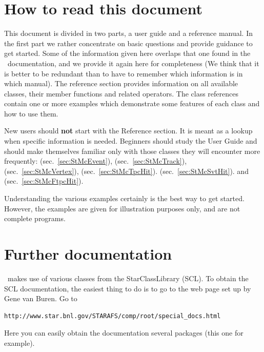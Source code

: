 \clearpage


\section{How to read this document}

This document is divided in two parts, a user guide and a
reference manual. In the first part we rather concentrate on basic
questions and provide guidance to get started.  Some of the information
given here overlaps that one found in the \StEvent\ documentation,
and we provide it again here for completeness (We think that it is better
to be redundant than to have to remember which information is in which
manual).  The reference section
provides information on all available classes, their member functions
and related operators. The class references contain one or more
examples which demonstrate some features of each class and how to use
them.

New users should \textbf{not} start with the Reference section. It is
meant as a lookup when specific information is needed. Beginners
should study the User Guide and should make themselves familiar only
with those classes they will encounter more frequently:
  (sec.~\ref{sec:StMcEvent}),
  (sec.~\ref{sec:StMcTrack}),
 (sec.~\ref{sec:StMcVertex}),
 (sec.~\ref{sec:StMcTpcHit}).
 (sec.~\ref{sec:StMcSvtHit}).
and  (sec.~\ref{sec:StMcFtpcHit}).



Understanding the various
examples certainly is the best way to get started. However, the examples
are given for illustration purposes only, and are not complete programs.


\section{Further documentation}
\label{sec:furtherdoc}

\StMcEvent\ makes use of various classes from the StarClassLibrary (SCL).
To obtain the SCL documentation, the easiest thing to do is to go to
the web page set up by Gene van Buren. 
Go to
\begin{verbatim}
http://www.star.bnl.gov/STARAFS/comp/root/special_docs.html
\end{verbatim}
Here you can easily obtain the documentation several packages
(this one for example).
 

